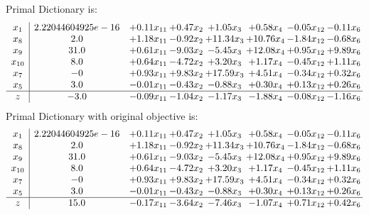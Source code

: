 \documentclass[8pt]{article}
\begin{document}
Primal Dictionary is:
\[\begin{array}{c| c c@{\hskip 2pt} c@{\hskip 2pt} c@{\hskip 2pt} c@{\hskip 2pt} c@{\hskip 2pt} c@{\hskip 2pt} }
 x_{1}   &  2.22044604925e-16 & +  0.11 x_{11} & +  0.47 x_{2} & +  1.05 x_{3} & +  0.58 x_{4} & -0.05 x_{12} & -0.11 x_{6}\\
 x_{8}   &  2.0 & +  1.18 x_{11} & -0.92 x_{2} & + 11.34 x_{3} & + 10.76 x_{4} & -1.84 x_{12} & -0.68 x_{6}\\
 x_{9}   &  31.0 & +  0.61 x_{11} & -9.03 x_{2} & -5.45 x_{3} & + 12.08 x_{4} & +  0.95 x_{12} & +  9.89 x_{6}\\
 x_{10}   &  8.0 & +  0.64 x_{11} & -4.72 x_{2} & +  3.20 x_{3} & +  1.17 x_{4} & -0.45 x_{12} & +  1.11 x_{6}\\
 x_{7}   &  -0 & +  0.93 x_{11} & +  9.83 x_{2} & + 17.59 x_{3} & +  4.51 x_{4} & -0.34 x_{12} & +  0.32 x_{6}\\
 x_{5}   &  3.0 & -0.01 x_{11} & -0.43 x_{2} & -0.88 x_{3} & +  0.30 x_{4} & +  0.13 x_{12} & +  0.26 x_{6}\\
\hline
z    &  -3.0 & -0.09 x_{11} & -1.04 x_{2} & -1.17 x_{3} & -1.88 x_{4} & -0.08 x_{12} & -1.16 x_{6}\\
\end{array}\]
Primal Dictionary with original objective is:
\[\begin{array}{c| c c@{\hskip 2pt} c@{\hskip 2pt} c@{\hskip 2pt} c@{\hskip 2pt} c@{\hskip 2pt} c@{\hskip 2pt} }
 x_{1}   &  2.22044604925e-16 & +  0.11 x_{11} & +  0.47 x_{2} & +  1.05 x_{3} & +  0.58 x_{4} & -0.05 x_{12} & -0.11 x_{6}\\
 x_{8}   &  2.0 & +  1.18 x_{11} & -0.92 x_{2} & + 11.34 x_{3} & + 10.76 x_{4} & -1.84 x_{12} & -0.68 x_{6}\\
 x_{9}   &  31.0 & +  0.61 x_{11} & -9.03 x_{2} & -5.45 x_{3} & + 12.08 x_{4} & +  0.95 x_{12} & +  9.89 x_{6}\\
 x_{10}   &  8.0 & +  0.64 x_{11} & -4.72 x_{2} & +  3.20 x_{3} & +  1.17 x_{4} & -0.45 x_{12} & +  1.11 x_{6}\\
 x_{7}   &  -0 & +  0.93 x_{11} & +  9.83 x_{2} & + 17.59 x_{3} & +  4.51 x_{4} & -0.34 x_{12} & +  0.32 x_{6}\\
 x_{5}   &  3.0 & -0.01 x_{11} & -0.43 x_{2} & -0.88 x_{3} & +  0.30 x_{4} & +  0.13 x_{12} & +  0.26 x_{6}\\
\hline
z    &  15.0 & -0.17 x_{11} & -3.64 x_{2} & -7.46 x_{3} & -1.07 x_{4} & +  0.71 x_{12} & +  0.42 x_{6}\\
\end{array}\]
\end{document}
